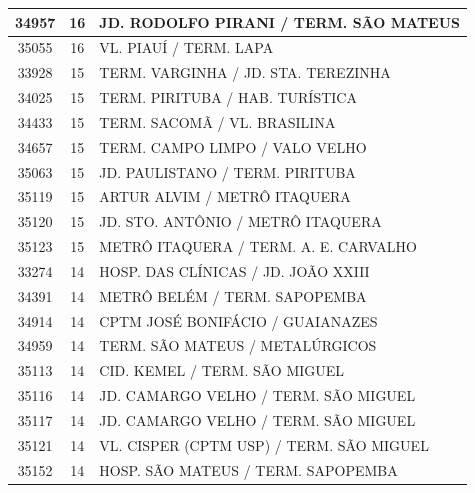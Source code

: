 \documentclass[
	12pt,				%
	oneside,			%
	a4paper,			%
	english,			%
	brazil				%
	]{abntex2ppgsi}
\begin{document}
\begin{apendicesenv}
\begin{longtable}{c|c|p{7cm}}
    34957 & 16    & JD. RODOLFO PIRANI / TERM. SÃO MATEUS \\
\hline

    35055 & 16    & VL. PIAUÍ / TERM. LAPA \\
\hline

    33928 & 15    & TERM. VARGINHA / JD. STA. TEREZINHA \\
\hline

    34025 & 15    & TERM. PIRITUBA / HAB. TURÍSTICA \\
\hline

    34433 & 15    & TERM. SACOMÃ / VL. BRASILINA \\
\hline

    34657 & 15    & TERM. CAMPO LIMPO / VALO VELHO \\
\hline

    35063 & 15    & JD. PAULISTANO / TERM. PIRITUBA \\
\hline

    35119 & 15    & ARTUR ALVIM / METRÔ ITAQUERA \\
\hline

    35120 & 15    & JD. STO. ANTÔNIO / METRÔ ITAQUERA \\
\hline

    35123 & 15    & METRÔ ITAQUERA / TERM. A. E. CARVALHO \\
\hline

    33274 & 14    & HOSP. DAS CLÍNICAS / JD. JOÃO XXIII \\
\hline

    34391 & 14    & METRÔ BELÉM / TERM. SAPOPEMBA \\
\hline

    34914 & 14    & CPTM JOSÉ BONIFÁCIO / GUAIANAZES \\
\hline

    34959 & 14    & TERM. SÃO MATEUS / METALÚRGICOS \\
\hline

    35113 & 14    & CID. KEMEL / TERM. SÃO MIGUEL \\
\hline

    35116 & 14    & JD. CAMARGO VELHO / TERM. SÃO MIGUEL \\
\hline

    35117 & 14    & JD. CAMARGO VELHO / TERM. SÃO MIGUEL \\
\hline

    35121 & 14    & VL. CISPER (CPTM USP) / TERM. SÃO MIGUEL \\
\hline

    35152 & 14    & HOSP. SÃO MATEUS / TERM. SAPOPEMBA \\
\hline


\end{longtable}
\end{apendicesenv}
\end{document}
